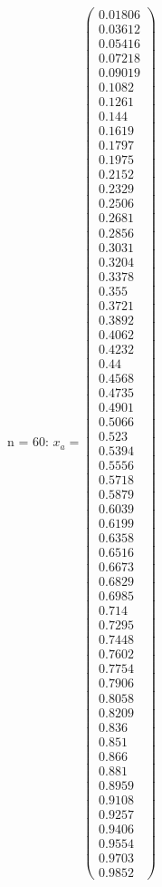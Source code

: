 \documentclass{udpreport}
\begin{document}
\begin{enumerate}
\begin {enumerate}
\begin{enumerate}
\begin{itemize}
				
				n = 60:
				$x_{a} = \left(\begin{array}{c} 0.01806\\ 0.03612\\ 0.05416\\ 0.07218\\ 0.09019\\ 0.1082\\ 0.1261\\ 0.144\\ 0.1619\\ 0.1797\\ 0.1975\\ 0.2152\\ 0.2329\\ 0.2506\\ 0.2681\\ 0.2856\\ 0.3031\\ 0.3204\\ 0.3378\\ 0.355\\ 0.3721\\ 0.3892\\ 0.4062\\ 0.4232\\ 0.44\\ 0.4568\\ 0.4735\\ 0.4901\\ 0.5066\\ 0.523\\ 0.5394\\ 0.5556\\ 0.5718\\ 0.5879\\ 0.6039\\ 0.6199\\ 0.6358\\ 0.6516\\ 0.6673\\ 0.6829\\ 0.6985\\ 0.714\\ 0.7295\\ 0.7448\\ 0.7602\\ 0.7754\\ 0.7906\\ 0.8058\\ 0.8209\\ 0.836\\ 0.851\\ 0.866\\ 0.881\\ 0.8959\\ 0.9108\\ 0.9257\\ 0.9406\\ 0.9554\\ 0.9703\\ 0.9852 \end{array}\right)$

\end{itemize}
\end{enumerate}
\end{enumerate}
\end{enumerate}
\end{document}
